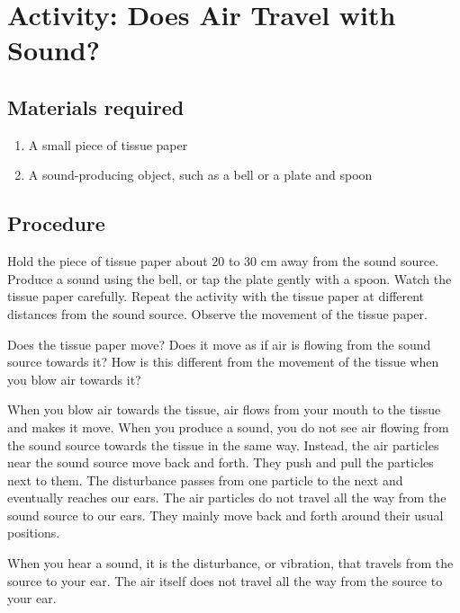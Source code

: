 \section{Activity: Does Air Travel with Sound?}
\subsection{Materials required}
\begin{enumerate}
    \item A small piece of tissue paper
    \item A sound-producing object, such as a bell or a plate and spoon
\end{enumerate}
\subsection{Procedure}
Hold the piece of tissue paper about 20 to 30 cm away from the sound source. Produce a sound using the bell, or tap the plate gently with a spoon. Watch the tissue paper carefully. Repeat the activity with the tissue paper at different distances from the sound source. Observe the movement of the tissue paper.
\begin{marginfigure}
  \caption{Illustration of long table with a lit candle on one end and a plate and spoon used as sound making instrument on the other end}
\end{marginfigure}
 Does the tissue paper move? Does it move as if air is flowing from the sound source towards it? How is this different from the movement of the tissue when you blow air towards it?

 When you blow air towards the tissue, air flows from your mouth to the tissue and makes it move. When you produce a sound, you do not see air flowing from the sound source towards the tissue in the same way. Instead, the air particles near the sound source move back and forth. They push and pull the particles next to them. The disturbance passes from one particle to the next and eventually reaches our ears. The air particles do not travel all the way from the sound source to our ears. They mainly move back and forth around their usual positions.

When you hear a sound, it is the disturbance, or vibration, that travels from the source to your ear. The air itself does not travel all the way from the source to your ear.